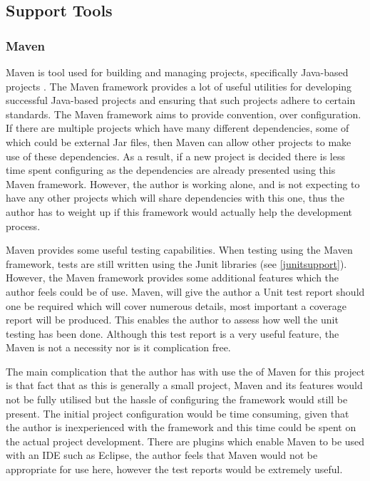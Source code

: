 \subsection{Support Tools}

\subsubsection{Maven}

Maven is tool used for building and managing projects, specifically Java-based projects \cite{maven:site}. The Maven framework provides a lot of useful utilities for developing successful Java-based projects and ensuring that such projects adhere to certain standards. The Maven framework aims to provide convention, over configuration. If there are multiple projects which have many different dependencies, some of which could be external Jar files, then Maven can allow other projects to make use of these dependencies. As a result, if a new project is decided there is less time spent configuring as the dependencies are already presented using this Maven framework. However, the author is working alone, and is not expecting to have any other projects which will share dependencies with this one, thus the author has to weight up if this framework would actually help the development process.

Maven provides some useful testing capabilities. When testing using the Maven framework, tests are still written using the Junit libraries (see \ref{junitsupport}). However, the Maven framework provides some additional features which the author feels could be of use. Maven, will give the author a Unit test report should one be required which will cover numerous details, most important a coverage report will be produced. This enables the author to assess how well the unit testing has been done. Although this test report is a very useful feature, the Maven is not a necessity nor is it complication free.

The main complication that the author has with use the of Maven for this project is that fact that as this is generally a small project, Maven and its features would not be fully utilised but the hassle of configuring the framework would still be present. The initial project configuration would be time consuming, given that the author is inexperienced with the framework and this time could be spent on the actual project development. There are plugins which enable Maven to be used with an IDE such as Eclipse, the author feels that Maven would not be appropriate for use here, however the test reports would be extremely useful.

